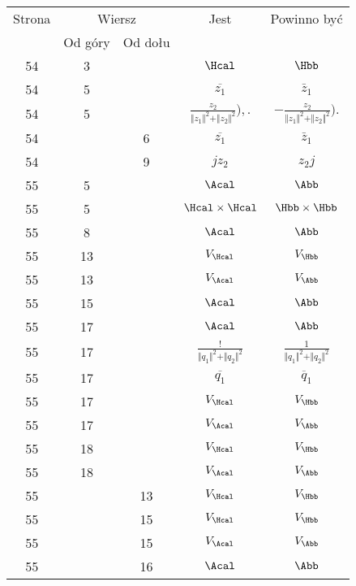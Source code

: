 \documentclass[a4paper,11pt]{article}
\numberwithin{equation}{section}
\begin{document}
\begin{center}
  \begin{tabular}{|c|c|c|c|c|}
    \hline
    Strona & \multicolumn{2}{c|}{Wiersz} & Jest
                              & Powinno być \\ \cline{2-3}
    & Od góry & Od dołu & & \\
    \hline
    54  & \hphantom{0}3 & & $\Hcal$ & $\Hbb$ \\
    54  & \hphantom{0}5 & & $\overline{ z_{ 1 } }$ & $\bar{ z }_{ 1 }$ \\
    54  & \hphantom{0}5 & & $\frac{ z_{ 2 } }
                 { \Vert z_{ 1 } \Vert^{ 2 } + \Vert z_{ 2 } \Vert^{ 2 } } ),.$
           & $-\frac{ z_{ 2 } }
             { \Vert z_{ 1 } \Vert^{ 2 } + \Vert z_{ 2 } \Vert^{ 2 } } ).$ \\
    54  & & \hphantom{0}6 & $\overline{ z_{ 1 } }$ & $\bar{ z }_{ 1 }$ \\
    54  & & \hphantom{0}9 & $j z_{ 2 }$ & $z_{ 2 } j$ \\
    55  & \hphantom{0}5 & & $\Acal$ & $\Abb$ \\
    55  & \hphantom{0}5 & & $\Hcal \times \Hcal$ & $\Hbb \times \Hbb$ \\
    55  & \hphantom{0}8 & & $\Acal$ & $\Abb$ \\
    55  & 13 & & $V_{ \Hcal }$ & $V_{ \Hbb }$ \\
    55  & 13 & & $V_{ \Acal }$ & $V_{ \Abb }$ \\
    55  & 15 & & $\Acal$ & $\Abb$ \\
    55  & 17 & & $\Acal$ & $\Abb$ \\
    55  & 17 & & $\frac{ ! }{ \Vert q_{ 1 } \Vert^{ 2 } + \Vert q_{ 2 } \Vert^{ 2 } }$
           & $\frac{ 1 }
             { \Vert q_{ 1 } \Vert^{ 2 } + \Vert q_{ 2 } \Vert^{ 2 } }$ \\
    55  & 17 & & $\overline{ q_{ 1 } }$ & $\overline{ q }_{ 1 }$ \\
    55  & 17 & & $V_{ \Hcal }$ & $V_{ \Hbb }$ \\
    55  & 17 & & $V_{ \Acal }$ & $V_{ \Abb }$ \\
    55  & 18 & & $V_{ \Hcal }$ & $V_{ \Hbb }$ \\
    55  & 18 & & $V_{ \Acal }$ & $V_{ \Abb }$ \\
    55  & & 13 & $V_{ \Hcal }$ & $V_{ \Hbb }$ \\
    55  & & 15 & $V_{ \Hcal }$ & $V_{ \Hbb }$ \\
    55  & & 15 & $V_{ \Acal }$ & $V_{ \Abb }$ \\
    55  & & 16 & $\Acal$ & $\Abb$ \\

\end{tabular}
\end{center}
\end{document}
